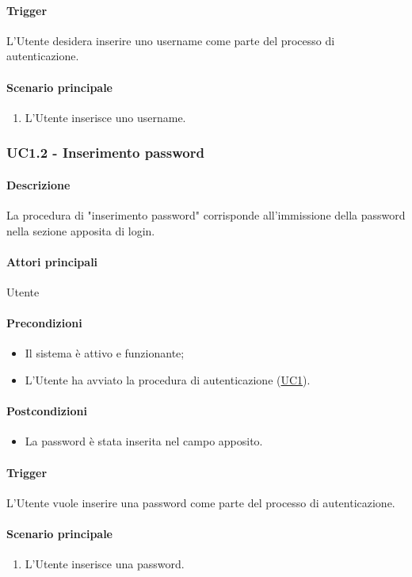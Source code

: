 \paragraph*{Trigger}
L'Utente desidera inserire uno username come parte del processo di autenticazione.

\paragraph*{Scenario principale}
\begin{enumerate}
  \item L'Utente inserisce uno username.
\end{enumerate}


\subsubsection{UC1.2 - Inserimento password}\label{UC1point2}
\paragraph*{Descrizione}
La procedura di "inserimento password" corrisponde all'immissione della password nella sezione apposita di login.

\paragraph*{Attori principali}
Utente

\paragraph*{Precondizioni}
\begin{itemize}
  \item Il sistema è attivo e funzionante;
  \item L'Utente ha avviato la procedura di autenticazione (\hyperref[UC1]{UC1}). 
\end{itemize}

\paragraph*{Postcondizioni}
\begin{itemize}
  \item La password è stata inserita nel campo apposito.
\end{itemize}

\paragraph*{Trigger}
L'Utente vuole inserire una password come parte del processo di autenticazione.

\paragraph*{Scenario principale}
\begin{enumerate}
  \item L'Utente inserisce una password.
\end{enumerate}